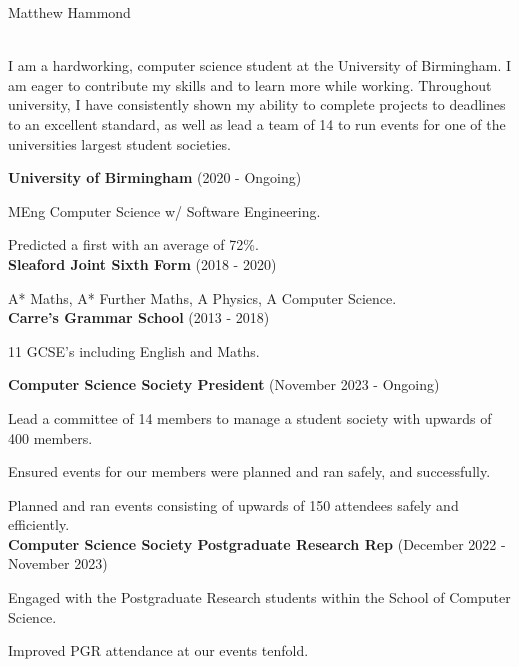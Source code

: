 \documentclass[twoside]{article}
\begin{document}
\begin{center}
    \noindent\huge Matthew Hammond
\end{center}\hr
{}
\hfill
{}\\
\hfill
{}\hr
I am a hardworking, computer science student at the University of Birmingham. I am eager to contribute my skills and to learn more while working. Throughout university, I have consistently shown my ability to complete projects to deadlines to an excellent standard, as well as lead a team of 14 to run events for one of the universities largest student societies.

\textbf{University of Birmingham} (2020 - Ongoing)\par
MEng Computer Science w/ Software Engineering.\par
Predicted a first with an average of 72\%.\\
\textbf{Sleaford Joint Sixth Form} (2018 - 2020)\par
A* Maths, A* Further Maths, A Physics, A Computer Science.\\
\textbf{Carre’s Grammar School} (2013 - 2018)\par
11 GCSE's including English and Maths.

\textbf{Computer Science Society President} (November 2023 - Ongoing)\par
Lead a committee of 14 members to manage a student society with upwards of 400 members.\par
Ensured events for our members were planned and ran safely, and successfully.\par
Planned and ran events consisting of upwards of 150 attendees safely and efficiently.\\
\textbf{Computer Science Society Postgraduate Research Rep} (December 2022 - November 2023)\par
Engaged with the Postgraduate Research students within the School of Computer Science.\par
Improved PGR attendance at our events tenfold.
\\
\end{document}
